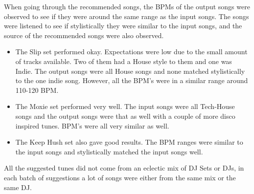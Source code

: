 When going through the recommended songs, the BPMs of the output songs were observed to see if they were around the same range as the input songs. The songs were listened to see if stylistically they were similar to the input songs, and the source of the recommended songs were also observed.

\begin{itemize}
	\item The Slip set performed okay. Expectations were low due to the small amount of tracks available. Two of them had a House style to them and one was Indie. The output songs were all House songs and none matched stylistically to the one indie song. However, all the BPM's were in a similar range around 110-120 BPM.
	\item The Moxie set performed very well. The input songs were all Tech-House songs and the output songs were that as well with a couple of more disco inspired tunes. BPM's were all very similar as well.  
	\item The Keep Hush set also gave good results. The BPM ranges were similar to the input songs and stylistically matched the input songs well. 
\end{itemize}

 

All the suggested tunes did not come from an eclectic mix of DJ Sets or DJs, in each batch of suggestions a lot of songs were either from the same mix or the same DJ. 


